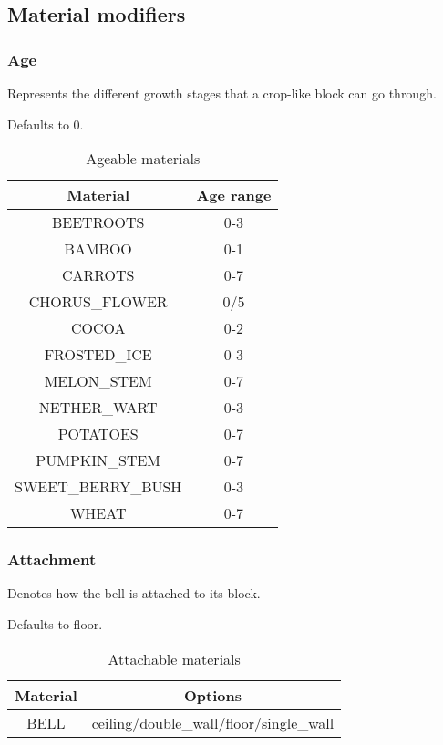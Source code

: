 \subsection{Material modifiers}
\subsubsection{Age}
Represents the different growth stages that a crop-like block can go through.

Defaults to 0.

\begin{table}[H]
	\centering
	\begin{tabular}{ |c|c| }
		\hline
		Material & Age range \\
		\hline
		BEETROOTS & 0-3 \\
		BAMBOO & 0-1 \\
		CARROTS & 0-7 \\
		CHORUS\_FLOWER & 0/5\footnotemark \\
		COCOA & 0-2 \\
		FROSTED\_ICE & 0-3 \\
		MELON\_STEM & 0-7 \\
		NETHER\_WART & 0-3 \\
		POTATOES & 0-7 \\
		PUMPKIN\_STEM & 0-7 \\
		SWEET\_BERRY\_BUSH & 0-3 \\
		WHEAT & 0-7 \\
		\hline
	\end{tabular}
	\caption{Ageable materials}
\end{table}


\subsubsection{Attachment}
Denotes how the bell is attached to its block.

Defaults to floor.

\begin{table}[H]
	\centering
	\begin{tabular}{ |c|c| }
		\hline
		Material & Options \\
		\hline
		BELL & ceiling/double\_wall/floor/single\_wall \\
		\hline
	\end{tabular}
	\caption{Attachable materials}
\end{table}

